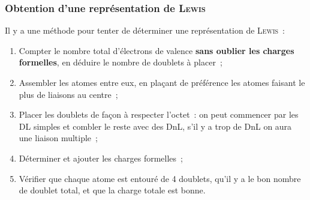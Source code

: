 \documentclass[../main/main.tex]{subfiles}
\begin{document}
\subsubsection{Obtention d'une représentation de \textsc{Lewis}}
Il y a une méthode pour tenter de déterminer une représentation de
\textsc{Lewis}~:
\begin{enumerate}[label=\sqenumi]
    \item Compter le nombre total d'électrons de valence \textbf{sans oublier
        les charges formelles}, en déduire le nombre
        de doublets à placer~;
    \item Assembler les atomes entre eux, en plaçant de préférence les atomes
        faisant le plus de liaisons au centre~;
    \item Placer les doublets de façon à respecter l'octet~: on peut commencer
        par les DL simples et combler le reste avec des DnL, s'il y a trop de
        DnL on aura une liaison multiple~;
    \item Déterminer et ajouter les charges formelles~;
    \item Vérifier que chaque atome est entouré de 4 doublets, qu'il y a le bon
        nombre de doublet total, et que la charge totale est bonne.
\end{enumerate}
\end{document}
